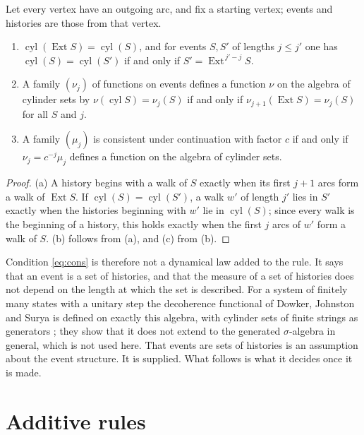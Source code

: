 \begin{lemma}\label{lem:cyl}
Let every vertex have an outgoing arc, and fix a starting vertex; events and histories are those from that vertex.
\begin{enumerate}[label=(\alph*)]
\item $\operatorname{cyl}(\operatorname{Ext}S)=\operatorname{cyl}(S)$, and for events $S,S'$ of lengths $j\le j'$ one has $\operatorname{cyl}(S)=\operatorname{cyl}(S')$ if and only if $S'=\operatorname{Ext}^{\,j'-j}S$.
\item A family $(\nu_j)$ of functions on events defines a function $\nu$ on the algebra of cylinder sets by $\nu(\operatorname{cyl}S)=\nu_j(S)$ if and only if $\nu_{j+1}(\operatorname{Ext}S)=\nu_j(S)$ for all $S$ and $j$.
\item A family $(\mu_j)$ is consistent under continuation with factor $c$ if and only if $\nu_j=c^{-j}\mu_j$ defines a function on the algebra of cylinder sets.
\end{enumerate}
\end{lemma}
\begin{proof}
(a) A history begins with a walk of $S$ exactly when its first $j+1$ arcs form a walk of $\operatorname{Ext}S$. If $\operatorname{cyl}(S)=\operatorname{cyl}(S')$, a walk $w'$ of length $j'$ lies in $S'$ exactly when the histories beginning with $w'$ lie in $\operatorname{cyl}(S)$; since every walk is the beginning of a history, this holds exactly when the first $j$ arcs of $w'$ form a walk of $S$. (b) follows from (a), and (c) from (b).
\end{proof}

Condition \eqref{eq:cons} is therefore not a dynamical law added to the rule. It says that an event is a set of histories, and that the measure of a set of histories does not depend on the length at which the set is described. For a system of finitely many states with a unitary step the decoherence functional of Dowker, Johnston and Surya is defined on exactly this algebra, with cylinder sets of finite strings as generators \cite{djsu}; they show that it does not extend to the generated $\sigma$-algebra in general, which is not used here. That events are sets of histories is an assumption about the event structure. It is supplied. What follows is what it decides once it is made.

\section{Additive rules}\label{sec:add}

